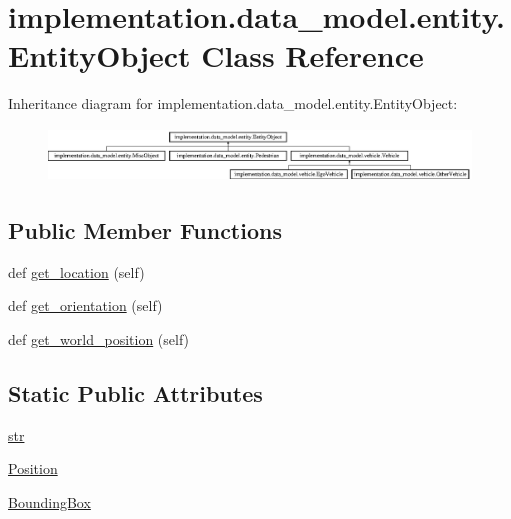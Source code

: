 \hypertarget{classimplementation_1_1data__model_1_1entity_1_1_entity_object}{}\section{implementation.\+data\+\_\+model.\+entity.\+Entity\+Object Class Reference}
\label{classimplementation_1_1data__model_1_1entity_1_1_entity_object}
Inheritance diagram for implementation.\+data\+\_\+model.\+entity.\+Entity\+Object\+:\begin{figure}[H]
\begin{center}
\leavevmode
\includegraphics[height=1.428571cm]{classimplementation_1_1data__model_1_1entity_1_1_entity_object}
\end{center}
\end{figure}
\subsection*{Public Member Functions}
\begin{DoxyCompactItemize}
\item 
def \hyperlink{classimplementation_1_1data__model_1_1entity_1_1_entity_object_a5daf332215d128db4067cb3d57708fd7}{get\+\_\+location} (self)
\item 
def \hyperlink{classimplementation_1_1data__model_1_1entity_1_1_entity_object_af4e061592d0d6ee3d191faace28ab781}{get\+\_\+orientation} (self)
\item 
def \hyperlink{classimplementation_1_1data__model_1_1entity_1_1_entity_object_a13695fb863c4e98d2c391f70a8373637}{get\+\_\+world\+\_\+position} (self)
\end{DoxyCompactItemize}
\subsection*{Static Public Attributes}
\begin{DoxyCompactItemize}
\item 
\hyperlink{classimplementation_1_1data__model_1_1entity_1_1_entity_object_a7ddc178ef36e8b94018411edb5ea62be}{str}
\item 
\hyperlink{classimplementation_1_1data__model_1_1entity_1_1_entity_object_a07c9819804b2d844354ba54ca1ccd563}{Position}
\item 
\hyperlink{classimplementation_1_1data__model_1_1entity_1_1_entity_object_a83e7ce8061eee760273dc616d92fb54d}{Bounding\+Box}
\end{DoxyCompactItemize}



